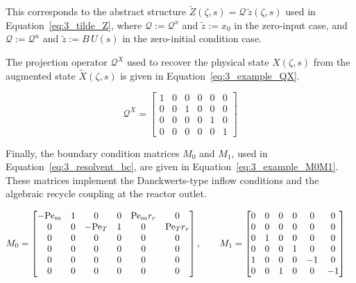 This corresponds to the abstract structure $\tilde{Z}(\zeta, s) = \mathcal{Q}\, \tilde{z}(\zeta, s)$ used in Equation~\ref{eq:3_tilde_Z}, where $\mathcal{Q} := \mathcal{Q}^x$ and $\tilde{z} := x_0$ in the zero-input case, and $\mathcal{Q} := \mathcal{Q}^u$ and $\tilde{z} := B\, U(s)$ in the zero-initial condition case.

The projection operator $\mathcal{Q}^X$ used to recover the physical state $X(\zeta, s)$ from the augmented state $\tilde{X}(\zeta, s)$ is given in Equation~\eqref{eq:3_example_QX}.

\begin{equation} \label{eq:3_example_QX}
\mathcal{Q}^X =
\begin{bmatrix}
1 & 0 & 0 & 0 & 0 & 0 \\
0 & 0 & 1 & 0 & 0 & 0 \\
0 & 0 & 0 & 0 & 1 & 0 \\
0 & 0 & 0 & 0 & 0 & 1
\end{bmatrix}
\end{equation}

Finally, the boundary condition matrices $M_0$ and $M_1$, used in Equation~\eqref{eq:3_resolvent_bc}, are given in Equation~\eqref{eq:3_example_M0M1}. These matrices implement the Danckwerts-type inflow conditions and the algebraic recycle coupling at the reactor outlet.

\begin{equation} \label{eq:3_example_M0M1}
\begin{aligned}
M_0 &= 
\begin{bmatrix}
-{\rm Pe}_m & 1 & 0 & 0 & {\rm Pe}_m r_r & 0 \\
0 & 0 & -{\rm Pe}_T & 1 & 0 & {\rm Pe}_T r_r \\
0 & 0 & 0 & 0 & 0 & 0 \\
0 & 0 & 0 & 0 & 0 & 0 \\
0 & 0 & 0 & 0 & 0 & 0 \\
0 & 0 & 0 & 0 & 0 & 0
\end{bmatrix}, \qquad
M_1 = 
\begin{bmatrix}
0 & 0 & 0 & 0 & 0 & 0 \\
0 & 0 & 0 & 0 & 0 & 0 \\
0 & 1 & 0 & 0 & 0 & 0 \\
0 & 0 & 0 & 1 & 0 & 0 \\
1 & 0 & 0 & 0 & -1 & 0 \\
0 & 0 & 1 & 0 & 0 & -1
\end{bmatrix}
\end{aligned}
\end{equation}

